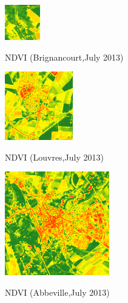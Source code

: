 \documentclass[c]{beamer}
\begin{document}
\begin{frame}
\begin{columns}
\begin{column}{0.25\textwidth}
 \begin{overlayarea}{\linewidth}{0.5cm}
  \centering\vfill
  \includegraphics[scale=0.17]{images/Brignancourt/07_ndvi.png}
  \end{overlayarea}
  \begin{overlayarea}{\linewidth}{0.5cm}
  \centering
  \tiny NDVI (Brignancourt,July 2013) \par
  \end{overlayarea}
  
  \begin{overlayarea}{\linewidth}{0.9cm}
  \centering\vfill
  \includegraphics[scale=0.17]{images/Louvres/07_ndvi.png}
  \end{overlayarea}
  \begin{overlayarea}{\linewidth}{0.5cm}
  \centering
  \tiny NDVI (Louvres,July 2013) \par
  \end{overlayarea}
  
  \begin{overlayarea}{\linewidth}{1.2cm}
  \centering\vfill
  \includegraphics[scale=0.17]{images/Abbeville/07_ndvi.png}
  \end{overlayarea}
  \begin{overlayarea}{\linewidth}{0.5cm}
  \centering
  \tiny NDVI (Abbeville,July 2013) \par
  \end{overlayarea}
  

\end{column}
\end{columns}
\end{frame}
\end{document}
